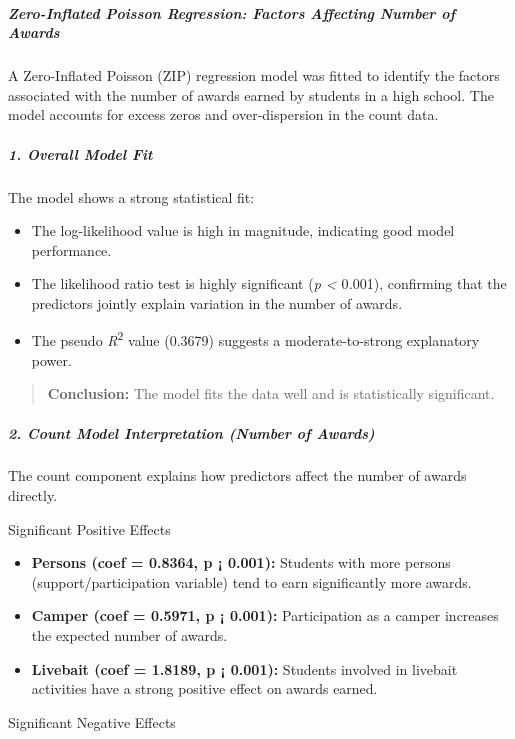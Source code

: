 \subparagraph{Zero-Inflated Poisson Regression: Factors Affecting Number
of
Awards}\label{zero-inflated-poisson-regression-factors-affecting-number-of-awards}

A Zero-Inflated Poisson (ZIP) regression model was fitted to identify
the factors associated with the number of awards earned by students in a
high school. The model accounts for excess zeros and over-dispersion in
the count data.

\subparagraph{1. Overall Model Fit}\label{overall-model-fit}

The model shows a strong statistical fit:

\begin{itemize}
\item
  The log-likelihood value is high in magnitude, indicating good model
  performance.
\item
  The likelihood ratio test is highly significant (\emph{p \textless{}}
  0\emph{.}001), confirming that the predictors jointly explain
  variation in the number of awards.
\item
  The pseudo \emph{R}\textsuperscript{2} value (0.3679) suggests a
  moderate-to-strong explanatory power.
\end{itemize}

\begin{quote}
\textbf{Conclusion:} The model fits the data well and is statistically
significant.
\end{quote}

\subparagraph{2. Count Model Interpretation (Number of
Awards)}\label{count-model-interpretation-number-of-awards}

The count component explains how predictors affect the number of awards
directly.

Significant Positive Effects

\begin{itemize}
\item
  \textbf{Persons (coef = 0.8364, p ¡ 0.001):} Students with more
  persons (support/participation variable) tend to earn significantly
  more awards.
\item
  \textbf{Camper (coef = 0.5971, p ¡ 0.001):} Participation as a camper
  increases the expected number of awards.
\item
  \textbf{Livebait (coef = 1.8189, p ¡ 0.001):} Students involved in
  livebait activities have a strong positive effect on awards earned.
\end{itemize}

Significant Negative Effects

